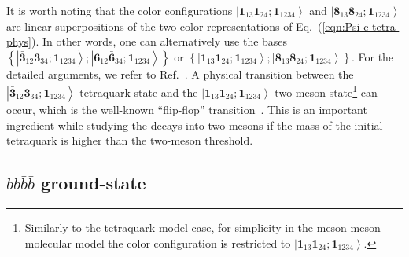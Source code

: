 \documentclass[twocolumn,showpacs,superscriptaddress,preprintnumbers,nofootinbib,prd]{revtex4-1}
\begin{document}
It is worth noting that the color configurations  $\left| \textbf{1}_{13} \textbf{1}_{24};
\textbf{1}_{1234} \right\rangle$ and $\left| \textbf{8}_{13} \textbf{8}_{24};
\textbf{1}_{1234} \right\rangle$ are linear superpositions of the two color
representations of Eq.~(\ref{eqn:Psi-c-tetra-phys}). In other words, one can
alternatively use the bases $\left\{ \left| \bar{\textbf{3}}_{12}\textbf{3}_{34};
\textbf{1}_{1234} \right\rangle; \left| \textbf{6}_{12}\bar{\textbf{6}}_{34};
\textbf{1}_{1234} \right\rangle \right\}$ or $\left\{ \left| \textbf{1}_{13}
\textbf{1}_{24}; \textbf{1}_{1234} \right\rangle; \left| \textbf{8}_{13} \textbf{8}_{24};
\textbf{1}_{1234} \right\rangle \right\}$. For the detailed arguments, we refer to Ref.~\cite{Weinstein:1983gd}.
A physical transition between the $\left| \bar{\textbf{3}}_{12}\textbf{3}_{34};
\textbf{1}_{1234} \right\rangle$ tetraquark state and the $\left| \textbf{1}_{13}
\textbf{1}_{24}; \textbf{1}_{1234} \right\rangle$ two-meson state\footnote{Similarly
to the tetraquark model case, for simplicity in the meson-meson molecular model
the color configuration is restricted to $\left| \textbf{1}_{13} \textbf{1}_{24};
\textbf{1}_{1234} \right\rangle$.}
can occur, which is the well-known ``flip-flop'' transition~\cite{Okiharu:2004ve}.
This is an important ingredient while studying the decays into two mesons
if the mass of the initial tetraquark is higher than the two-meson threshold.

\subsection{$b b \bar b \bar b$ ground-state}
\end{document}
